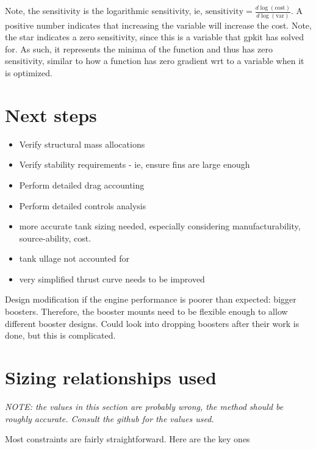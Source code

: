 \documentclass[12pt]{article}
\begin{document}
\begin{landscape}
Note, the sensitivity is the logarithmic sensitivity, ie, $\text{sensitivity} = \frac{d \log(\text{cost})}{d\log(\text{var})}$. A positive number indicates that increasing the variable will increase the cost. Note, the star indicates a zero sensitivity, since this is a variable that gpkit has solved for. As such, it represents the minima of the function and thus has zero sensitivity, similar to how a function has zero gradient wrt to a variable when it is optimized. 

\end{landscape}


\section{Next steps}
\begin{itemize}
\item Verify structural mass allocations
\item Verify stability requirements - ie, ensure fins are large enough
\item Perform detailed drag accounting
\item Perform detailed controls analysis
\item more accurate tank sizing needed, especially considering manufacturability, source-ability, cost.
\item tank ullage not accounted for
\item very simplified thrust curve needs to be improved
\end{itemize}

Design modification if the engine performance is poorer than expected: bigger boosters. Therefore, the booster mounts need to be flexible enough to allow different booster designs. Could look into dropping boosters after their work is done, but this is complicated. 

%
%

\section{Sizing relationships used}

\emph{NOTE: the values in this section are probably wrong, the method should be roughly accurate. Consult the github for the values used.}

Most constraints are fairly straightforward. Here are the key ones
\end{document}
